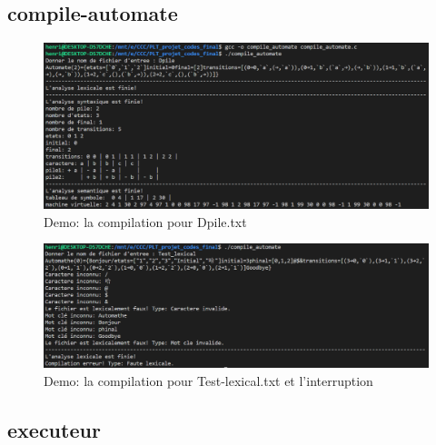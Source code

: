 \documentclass[a4paper,14pt,UTF8]{article}
\begin{document}
	
	\subsection{compile-automate}
	
	\begin{figure}[H]
		\setlength{\abovecaptionskip}{-0.cm}
		
		\begin{center}
			\includegraphics[width=16cm]{compilation1}
		\end{center}
		\caption{Demo: la compilation pour Dpile.txt}
	\end{figure}

	\begin{figure}[H]
	\setlength{\abovecaptionskip}{-0.cm}
	
	\begin{center}
		\includegraphics[width=16cm]{compilation2}
	\end{center}
	\caption{Demo: la compilation pour Test-lexical.txt et l'interruption}
	\end{figure}
	
	\subsection{executeur}
	
\end{document}
